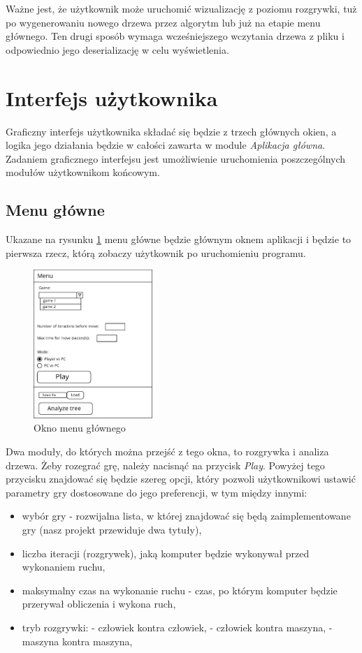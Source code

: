 \documentclass{article}
\let\oldsection\section
\renewcommand\section{\clearpage\oldsection}
\newcommand{\modulename}[1]{\textit{#1}}
\begin{document}
	\noindent Ważne jest, że użytkownik może uruchomić wizualizację z poziomu rozgrywki, tuż po wygenerowaniu nowego drzewa przez algorytm lub już na etapie menu głównego. Ten drugi sposób wymaga wcześniejszego wczytania drzewa z pliku i odpowiednio jego deserializację w celu wyświetlenia.
	
	\section{Interfejs użytkownika}
	Graficzny interfejs użytkownika składać się będzie z trzech głównych okien, a logika jego działania będzie w całości zawarta w module \modulename{Aplikacja główna}. Zadaniem graficznego interfejsu jest umożliwienie uruchomienia poszczególnych modułów użytkownikom końcowym.
	
	\subsection{Menu główne}
	Ukazane na rysunku \ref{rys:main_menu} menu główne będzie głównym oknem aplikacji i będzie to pierwsza rzecz, którą zobaczy użytkownik po uruchomieniu programu.
	\begin{figure}[h!]
		\centering
		\includegraphics[width=0.4\textwidth]{menu-eps}
		\caption{Okno menu głównego}
		\label{rys:main_menu}
	\end{figure}

	\noindent Dwa moduły, do których można przejść z tego okna, to rozgrywka i analiza drzewa.	Żeby rozegrać grę, należy nacisnąć na przycisk \textit{Play}. Powyżej tego przycisku znajdować się będzie szereg opcji, który pozwoli użytkownikowi ustawić parametry gry dostosowane do jego preferencji, w tym między innymi:\\
	
	\begin{itemize}
		\item wybór gry - rozwijalna lista, w której znajdować się będą zaimplementowane gry (nasz projekt przewiduje dwa tytuły),
		\item liczba iteracji (rozgrywek), jaką komputer będzie wykonywał przed wykonaniem ruchu,
		\item maksymalny czas na wykonanie ruchu - czas, po którym komputer będzie przerywał obliczenia i wykona ruch,
		\item tryb rozgrywki:
		\subitem - człowiek kontra człowiek,
		\subitem - człowiek kontra maszyna,
		\subitem - maszyna kontra maszyna,\\
	\end{itemize}
\end{document}
